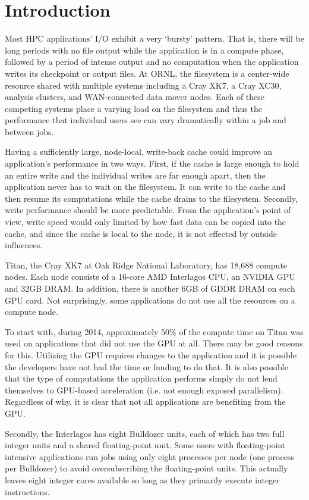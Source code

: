 \section{Introduction}
\label{sec:intro}

Most HPC applications' I/O exhibit a very `bursty' pattern. That is, there will be long periods with no file output while the application is in a compute phase, followed by a period of intense output and no computation when the application writes its checkpoint or output files.  At ORNL, the filesystem is a center-wide resource shared with multiple systems including a Cray XK7, a Cray XC30, analysis clusters, and WAN-connected data mover nodes. Each of these competing systems place a varying load on the filesystem and thus the performance that individual users see can vary dramatically within a job and between jobs.

Having a sufficiently large, node-local, write-back cache could improve an application's performance in two ways.  First, if the cache is large enough to hold an entire write and the individual writes are far enough apart, then the application never has to wait on the filesystem.  It can write to the cache and then resume its computations while the cache drains to the filesystem.  Secondly, write performance should be more predictable. From the application's point of view, write speed would only limited by how fast data can be copied into the cache, and since the cache is local to the node, it is not effected by outside influences.

Titan, the Cray XK7 at Oak Ridge National Laboratory, has 18,688 compute nodes. Each node consists of a 16-core AMD Interlagos CPU, an NVIDIA GPU and 32GB DRAM. In addition, there is another 6GB of GDDR DRAM on each GPU card. Not surprisingly, some applications do not use all the resources on a compute node.

To start with, during 2014, approximately 50\% of the compute time on Titan was used on applications that did not use the GPU at all.\cite{oareport}
There may be good reasons for this.  Utilizing the GPU requires changes to the application and it is possible the developers have not had the time or funding to do that.  It is also possible that the type of computations the application performs simply do not lend themselves to GPU-based acceleration (i.e. not enough exposed parallelism).  Regardless of why, it is clear that not all applications are benefiting from the GPU.

Secondly, the Interlagos has eight Bulldozer units, each of which has two full integer units and a shared floating-point unit. Some users with floating-point intensive applications run jobs using only eight processes per node (one process per Bulldozer) to avoid oversubscribing the floating-point units. This actually leaves eight integer cores available so long as they primarily execute integer instructions. 


